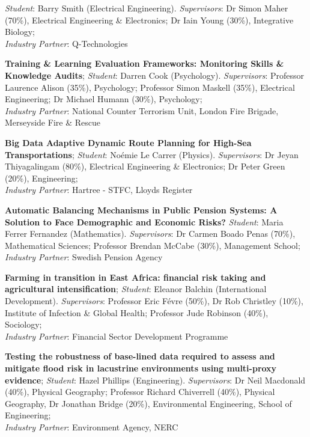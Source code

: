 \documentclass[11pt]{article}%
\begin{document}
\begin{minipage}{0.99\textwidth}
\begin{itemize}
{\textit{Student}: Barry Smith (Electrical Engineering).  
\textit{Supervisors}: Dr Simon Maher (70{\%}), Electrical Engineering \& Electronics; Dr Iain Young (30{\%}), Integrative Biology; \\
\textit{Industry Partner}: Q-Technologies
\vspace{5pt}
\item {\bf Training \& Learning Evaluation Frameworks: Monitoring Skills \& Knowledge Audits};
\textit{Student}: Darren Cook (Psychology).  
\textit{Supervisors}: Professor Laurence Alison (35{\%}), Psychology; Professor Simon Maskell (35{\%}), Electrical Engineering; Dr Michael Humann (30{\%}), Psychology; \\
\textit{Industry Partner}: National Counter Terrorism Unit, London Fire Brigade, Merseyside Fire \& Rescue
\vspace{5pt}
\item {\bf Big Data Adaptive Dynamic Route Planning for High-Sea Transportations};
\textit{Student}: No{\'e}mie Le Carrer (Physics). 
\textit{Supervisors}: Dr Jeyan Thiyagalingam (80{\%}), Electrical Engineering \& Electronics; Dr Peter Green (20{\%}), Engineering; \\
\textit{Industry Partner}: Hartree - STFC, Lloyds Register
\vspace{5pt}
\item {\bf Automatic Balancing Mechanisms in Public Pension Systems: A Solution to Face Demographic and
 Economic Risks?}
\textit{Student}: Maria Ferrer Fernandez (Mathematics). 
\textit{Supervisors}: Dr Carmen Boado Penas (70{\%}), Mathematical Sciences; Professor Brendan McCabe (30{\%}), Management School; \\
\textit{Industry Partner}: Swedish Pension Agency
\vspace{5pt}
\item {\bf Farming in transition in East Africa: financial risk taking and agricultural intensification};
\textit{Student}: Eleanor Balchin (International Development). 
\textit{Supervisors}: Professor Eric F{\'e}vre (50{\%}), Dr Rob Christley (10{\%}), Institute of Infection \& Global Health; Professor Jude Robinson (40{\%}), Sociology; \\
\textit{Industry Partner}: Financial Sector Development Programme
\vspace{5pt}
\item {\bf Testing the robustness of base-lined data required to assess and mitigate flood risk in 
lacustrine environments using multi-proxy evidence};
\textit{Student}: Hazel Phillips (Engineering). 
\textit{Supervisors}: Dr Neil Macdonald (40{\%}), Physical Geography; Professor Richard Chiverrell (40{\%}), Physical Geography, Dr Jonathan Bridge (20{\%}), Environmental Engineering, School of Engineering; \\
\textit{Industry Partner}: Environment Agency, NERC
}
\end{itemize}


\end{minipage}
\end{document}
